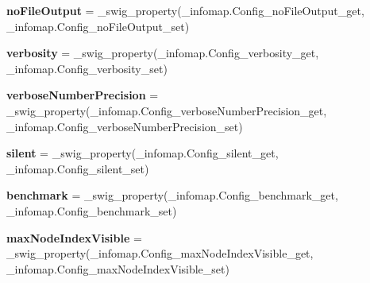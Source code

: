 \begin{DoxyCompactItemize}
\item 
\mbox{\label{classdsmacc_1_1graph_1_1infomap_1_1infomap_1_1Config_a4d6f43eb48960c803f995a2d08e131a7}} 
{\bfseries no\+File\+Output} = \+\_\+swig\+\_\+property(\+\_\+infomap.\+Config\+\_\+no\+File\+Output\+\_\+get, \+\_\+infomap.\+Config\+\_\+no\+File\+Output\+\_\+set)
\item 
\mbox{\label{classdsmacc_1_1graph_1_1infomap_1_1infomap_1_1Config_a70081ea53126bce8a5e6748c3ebfe190}} 
{\bfseries verbosity} = \+\_\+swig\+\_\+property(\+\_\+infomap.\+Config\+\_\+verbosity\+\_\+get, \+\_\+infomap.\+Config\+\_\+verbosity\+\_\+set)
\item 
\mbox{\label{classdsmacc_1_1graph_1_1infomap_1_1infomap_1_1Config_abe7006acedfcdd34ca8c9a7e975bd533}} 
{\bfseries verbose\+Number\+Precision} = \+\_\+swig\+\_\+property(\+\_\+infomap.\+Config\+\_\+verbose\+Number\+Precision\+\_\+get, \+\_\+infomap.\+Config\+\_\+verbose\+Number\+Precision\+\_\+set)
\item 
\mbox{\label{classdsmacc_1_1graph_1_1infomap_1_1infomap_1_1Config_a9195d484b210c9ccccbcb5afedd8cbd4}} 
{\bfseries silent} = \+\_\+swig\+\_\+property(\+\_\+infomap.\+Config\+\_\+silent\+\_\+get, \+\_\+infomap.\+Config\+\_\+silent\+\_\+set)
\item 
\mbox{\label{classdsmacc_1_1graph_1_1infomap_1_1infomap_1_1Config_a44da52e387a7aaf9b0258b56d2ed8c9c}} 
{\bfseries benchmark} = \+\_\+swig\+\_\+property(\+\_\+infomap.\+Config\+\_\+benchmark\+\_\+get, \+\_\+infomap.\+Config\+\_\+benchmark\+\_\+set)
\item 
\mbox{\label{classdsmacc_1_1graph_1_1infomap_1_1infomap_1_1Config_a5dd1ebba71517b369ec244ce5f0f480a}} 
{\bfseries max\+Node\+Index\+Visible} = \+\_\+swig\+\_\+property(\+\_\+infomap.\+Config\+\_\+max\+Node\+Index\+Visible\+\_\+get, \+\_\+infomap.\+Config\+\_\+max\+Node\+Index\+Visible\+\_\+set)
\item 
\mbox{\label{classdsmacc_1_1graph_1_1infomap_1_1infomap_1_1Config_a4387b3bb899665dba8346cee931e7f87}} 

\end{DoxyCompactItemize}
